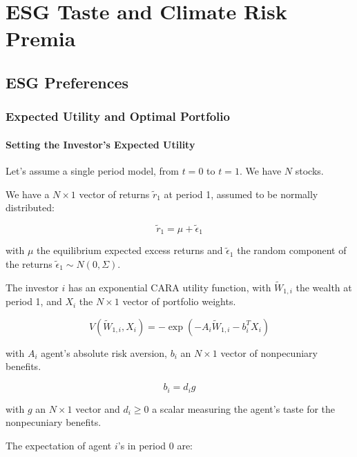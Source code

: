 \chapter{ESG Taste and Climate Risk Premia}

\section{ESG Preferences}


\subsection{Expected Utility and Optimal Portfolio}


\subsubsection{Setting the Investor's Expected Utility}

Let's assume a single period model, from $t=0$ to $t=1$.
We have $N$ stocks. 

We have a $N \times 1$ vector of returns $\tilde{r}_1$ at period 1, 
assumed to be normally distributed: 

\begin{equation}
    \tilde{r}_1 = \mu + \tilde{\epsilon}_1
\end{equation}

with $\mu$ the equilibrium expected excess returns and $\tilde{\epsilon}_1$ the
random component of the returns $\tilde{\epsilon}_1 \sim N(0, \Sigma)$.

The investor $i$ has an exponential CARA utility function, with 
$\tilde{W}_{1,i}$ the wealth at period 1, and $X_i$ the
$N \times 1$ vector of portfolio weights.

\begin{equation}
    V(\tilde{W}_{1,i}, X_i) = -\exp{(-A_i \tilde{W}_{1,i}-b_i^T X_i)}
\end{equation}

with $A_i$ agent's absolute risk aversion, $b_i$ an $N \times 1$ vector of nonpecuniary 
benefits. 

\begin{equation}
    b_i = d_i g 
\end{equation}

with $g$ an $N \times 1$ vector and $d_i \geq 0$ a scalar measuring 
the agent's taste for the nonpecuniary benefits.


The expectation of agent $i$'s in period 0 are:

